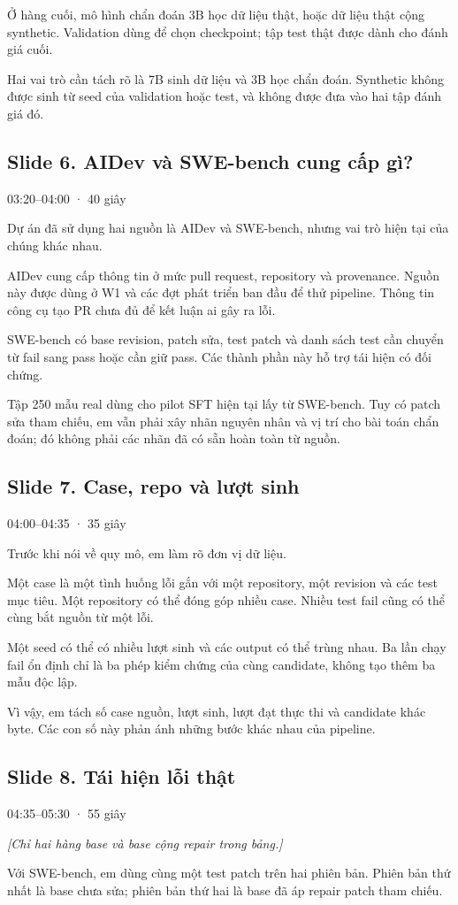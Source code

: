 \documentclass[12pt,a4paper]{article}
\begin{document}
Ở hàng cuối, mô hình chẩn đoán 3B học dữ liệu thật, hoặc dữ liệu thật cộng synthetic. Validation dùng để chọn checkpoint; tập test thật được dành cho đánh giá cuối.

Hai vai trò cần tách rõ là 7B sinh dữ liệu và 3B học chẩn đoán. Synthetic không được sinh từ seed của validation hoặc test, và không được đưa vào hai tập đánh giá đó.

\subsection*{Slide 6. AIDev và SWE-bench cung cấp gì?}
{\small\color{gray}03:20–04:00 · 40 giây}\par
Dự án đã sử dụng hai nguồn là AIDev và SWE-bench, nhưng vai trò hiện tại của chúng khác nhau.

AIDev cung cấp thông tin ở mức pull request, repository và provenance. Nguồn này được dùng ở W1 và các đợt phát triển ban đầu để thử pipeline. Thông tin công cụ tạo PR chưa đủ để kết luận ai gây ra lỗi.

SWE-bench có base revision, patch sửa, test patch và danh sách test cần chuyển từ fail sang pass hoặc cần giữ pass. Các thành phần này hỗ trợ tái hiện có đối chứng.

Tập 250 mẫu real dùng cho pilot SFT hiện tại lấy từ SWE-bench. Tuy có patch sửa tham chiếu, em vẫn phải xây nhãn nguyên nhân và vị trí cho bài toán chẩn đoán; đó không phải các nhãn đã có sẵn hoàn toàn từ nguồn.

\clearpage
\subsection*{Slide 7. Case, repo và lượt sinh}
{\small\color{gray}04:00–04:35 · 35 giây}\par
Trước khi nói về quy mô, em làm rõ đơn vị dữ liệu.

Một case là một tình huống lỗi gắn với một repository, một revision và các test mục tiêu. Một repository có thể đóng góp nhiều case. Nhiều test fail cũng có thể cùng bắt nguồn từ một lỗi.

Một seed có thể có nhiều lượt sinh và các output có thể trùng nhau. Ba lần chạy fail ổn định chỉ là ba phép kiểm chứng của cùng candidate, không tạo thêm ba mẫu độc lập.

Vì vậy, em tách số case nguồn, lượt sinh, lượt đạt thực thi và candidate khác byte. Các con số này phản ánh những bước khác nhau của pipeline.

\subsection*{Slide 8. Tái hiện lỗi thật}
{\small\color{gray}04:35–05:30 · 55 giây}\par
{\itshape\color{gray}[Chỉ hai hàng base và base cộng repair trong bảng.]}\par
Với SWE-bench, em dùng cùng một test patch trên hai phiên bản. Phiên bản thứ nhất là base chưa sửa; phiên bản thứ hai là base đã áp repair patch tham chiếu.
\end{document}

